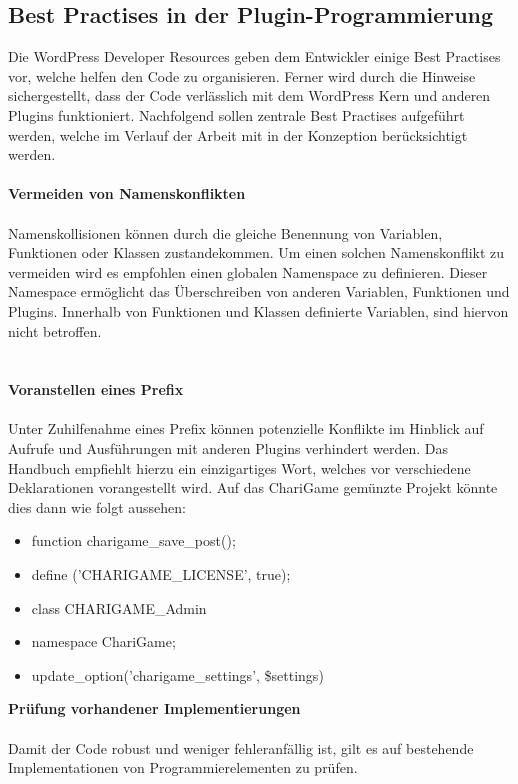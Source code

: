 \subsection{Best Practises in der Plugin-Programmierung}
Die WordPress Developer Resources geben dem Entwickler einige Best Practises vor, welche helfen den Code zu organisieren.
Ferner wird durch die Hinweise sichergestellt, dass der Code verlässlich mit dem WordPress Kern und anderen Plugins funktioniert.
Nachfolgend sollen zentrale Best Practises aufgeführt werden, welche im Verlauf der Arbeit mit in der Konzeption berücksichtigt werden.
\\
\\
\textbf{Vermeiden von Namenskonflikten}\\\\
Namenskollisionen können durch die gleiche Benennung von Variablen, Funktionen oder Klassen zustandekommen.
Um einen solchen Namenskonflikt zu vermeiden wird es empfohlen einen globalen Namenspace zu definieren.
Dieser Namespace ermöglicht das Überschreiben von anderen Variablen, Funktionen und Plugins.
Innerhalb von Funktionen und Klassen definierte Variablen, sind hiervon nicht betroffen.
\\
\\
\\
\textbf{Voranstellen eines Prefix}\\\\
Unter Zuhilfenahme eines Prefix können potenzielle Konflikte im Hinblick auf Aufrufe und Ausführungen mit anderen Plugins verhindert werden.
Das Handbuch empfiehlt hierzu ein einzigartiges Wort, welches vor verschiedene Deklarationen vorangestellt wird.
Auf das ChariGame gemünzte Projekt könnte dies dann wie folgt aussehen:
\begin{itemize}
 \item function charigame\_save\_post();
 \item define ('CHARIGAME\_LICENSE', true);
 \item class CHARIGAME\_Admin{}
 \item namespace ChariGame;
 \item update\_option('charigame\_settings', \$settings)
\end{itemize}
\vspace{1em}
\textbf{Prüfung vorhandener Implementierungen}\\\\
Damit der Code robust und weniger fehleranfällig ist, gilt es auf bestehende Implementationen von Programmierelementen zu prüfen.
